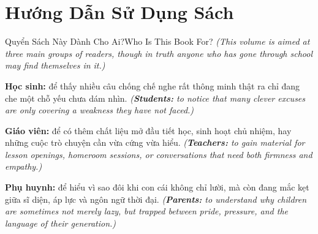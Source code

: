 \chapter*{Hướng Dẫn Sử Dụng Sách}

\begin{truyen}{Quyển Sách Này Dành Cho Ai?}{Who Is This Book For?}
\textit{(This volume is aimed at three main groups of readers, though in truth anyone who has gone through school may find themselves in it.)}

\textbf{Học sinh:} để thấy nhiều câu chống chế nghe rất thông minh thật ra chỉ đang che một chỗ yếu chưa dám nhìn.
\textit{(\textbf{Students:} to notice that many clever excuses are only covering a weakness they have not faced.)}

\textbf{Giáo viên:} để có thêm chất liệu mở đầu tiết học, sinh hoạt chủ nhiệm, hay những cuộc trò chuyện cần vừa cứng vừa hiểu.
\textit{(\textbf{Teachers:} to gain material for lesson openings, homeroom sessions, or conversations that need both firmness and empathy.)}

\textbf{Phụ huynh:} để hiểu vì sao đôi khi con cái không chỉ lười, mà còn đang mắc kẹt giữa sĩ diện, áp lực và ngôn ngữ thời đại.
\textit{(\textbf{Parents:} to understand why children are sometimes not merely lazy, but trapped between pride, pressure, and the language of their generation.)}
\end{truyen}

\vspace{6pt}

